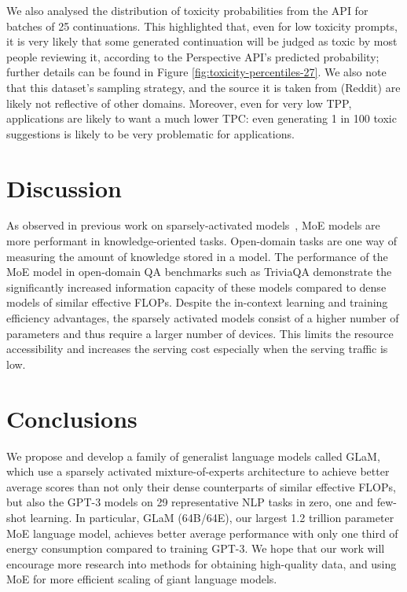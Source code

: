 \documentclass{article}
\newcommand{\glam}{GLaM\xspace}
\begin{document}
We also analysed the distribution of toxicity probabilities from the API for batches of 25 continuations. This highlighted that, even for low toxicity prompts, it is very likely that some generated continuation will be judged as toxic by most people reviewing it, according to the Perspective API's predicted probability; further details can be found in Figure \ref{fig:toxicity-percentiles-27}. We also note that this dataset's sampling strategy, and the source it is taken from (Reddit) are likely not reflective of other domains. Moreover, even for very low TPP, applications are likely to want a much lower TPC: even generating 1 in 100 toxic suggestions is likely to be very problematic for applications.




\section{Discussion}









As observed in previous work on sparsely-activated models~\cite{fedus2021switch}, MoE models are more performant in knowledge-oriented tasks. Open-domain tasks are one way of measuring the amount of knowledge stored in a model. The performance of the MoE model in open-domain QA benchmarks such as TriviaQA demonstrate the significantly increased information capacity of these models compared to dense models of similar effective FLOPs. Despite the in-context learning and training efficiency advantages, the sparsely activated models consist of a higher number of parameters and thus require a larger number of devices. This limits the resource accessibility and increases the serving cost especially when the serving traffic is low. 






\section{Conclusions}
\label{sec:conclustions}

We propose and develop a family of generalist language models called \glam, which use a sparsely activated mixture-of-experts architecture to achieve better average scores than not only their dense counterparts of similar effective FLOPs, but also the GPT-3 models on 29 representative NLP tasks in zero, one and few-shot learning. 
In particular,  GLaM (64B/64E), our largest 1.2 trillion parameter MoE language model, achieves better average performance  with only one third of energy consumption compared to training GPT-3. 
We hope that our work will encourage more research into methods for obtaining high-quality data, and using MoE for more efficient scaling of giant language models.
\end{document}
